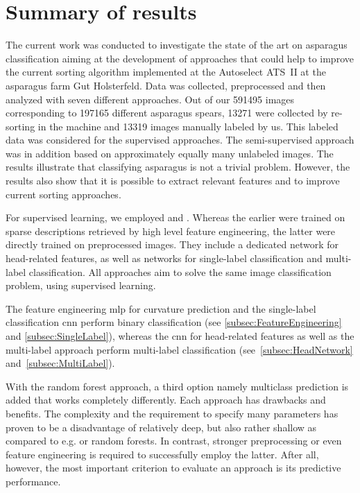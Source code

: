 \section{Summary of results}
\label{ch:Summary}

The current work was conducted to investigate the state of the art on asparagus classification aiming at the development of approaches that could help to improve the current sorting algorithm implemented at the Autoselect ATS~II at the asparagus farm Gut Holsterfeld. Data was collected, preprocessed and then analyzed with seven different approaches. Out of our 591495 images corresponding to 197165 different asparagus spears, 13271 were collected by re-sorting in the machine and 13319 images manually labeled by us. This labeled data was considered for the supervised approaches. The semi-supervised approach was in addition based on approximately equally many unlabeled images. The results illustrate that classifying asparagus is not a trivial problem. However, the results also show that it is possible to extract relevant features and to improve current sorting approaches.

\bigskip
For supervised learning, we employed  and  . Whereas the earlier were trained on sparse descriptions retrieved by high level feature engineering, the latter were directly trained on preprocessed images. They include a dedicated network for head-related features, as well as networks for single-label classification and multi-label classification. All approaches aim to solve the same image classification problem, using supervised learning.

The feature engineering \acrshort{mlp} for curvature prediction and the single-label classification \acrshort{cnn} perform binary classification (see \autoref{subsec:FeatureEngineering} and \autoref{subsec:SingleLabel}), whereas the  \acrshort{cnn} for head-related features as well as the multi-label approach perform multi-label classification (see~\autoref{subsec:HeadNetwork} and~\autoref{subsec:MultiLabel}).

With the random forest approach, a third option namely multiclass prediction is added that works completely differently. Each approach has drawbacks and benefits. The complexity and the requirement to specify many parameters has proven to be a disadvantage of relatively deep, but also rather shallow  as compared to e.g.  or random forests. In contrast, stronger preprocessing or even feature engineering is required to successfully employ the latter. After all, however, the most important criterion to evaluate an approach is its predictive performance.

